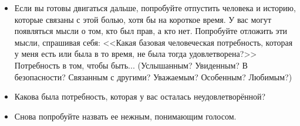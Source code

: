 \newpage
{}

\vspace{1ex}

\begin{itemize}
	\item Если вы готовы двигаться дальше, попробуйте отпустить человека и историю, которые связаны с этой болью, хотя бы на короткое время. У вас могут появляться мысли о том, кто был прав, а кто нет. Попробуйте отложить эти мысли, спрашивая себя: <<Какая базовая человеческая потребность, которая у меня есть или была в то время, не была тогда удовлетворена?>> Потребность в том, чтобы быть... (Услышанным? Увиденным? В безопасности? Связанным с другими? Уважаемым? Особенным? Любимым?)
	
	\item Какова была потребность, которая у вас осталась неудовлетворённой?
	
	\item Снова попробуйте назвать ее нежным, понимающим голосом. 
\end{itemize}

\vspace{3ex}


\vspace{1ex}

